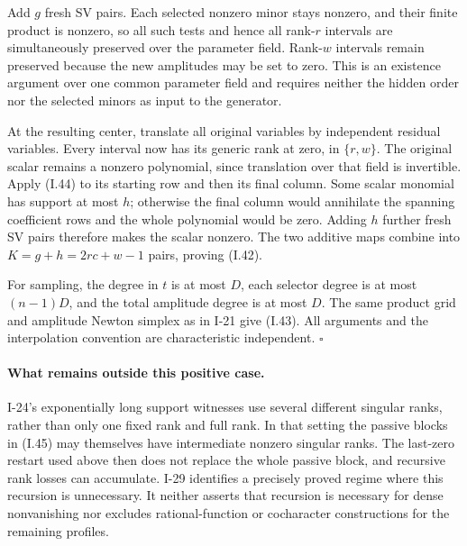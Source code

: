 Add $g$ fresh SV pairs.  Each selected nonzero minor stays
nonzero, and their finite product is nonzero, so all such
tests and hence all rank-$r$ intervals are simultaneously
preserved over the parameter field.  Rank-$w$ intervals
remain preserved because the new amplitudes may be set to
zero.  This is an existence argument over one common
parameter field and requires neither the hidden order nor
the selected minors as input to the generator.

At the resulting center, translate all original variables
by independent residual variables.  Every interval now
has its generic rank at zero, in $\{r,w\}$.  The original
scalar remains a nonzero polynomial, since translation
over that field is invertible.  Apply (I.44) to its starting
row and then its final column.  Some scalar monomial has
support at most $h$; otherwise the final column would
annihilate the spanning coefficient rows and the whole
polynomial would be zero.  Adding $h$ further fresh SV pairs
therefore makes the scalar nonzero.  The two additive maps
combine into $K=g+h=2rc+w-1$ pairs, proving (I.42).

For sampling, the degree in $t$ is at most $D$, each selector
degree is at most $(n-1)D$, and the total amplitude degree
is at most $D$.  The same product grid and amplitude Newton
simplex as in I-21 give (I.43).  All arguments and the
interpolation convention are characteristic independent.
\hfill$\square$

\paragraph{What remains outside this positive case.}
I-24's exponentially long support witnesses use several
different singular ranks, rather than only one fixed rank
and full rank.  In that setting the passive blocks in
(I.45) may themselves have intermediate nonzero singular
ranks.  The last-zero restart used above then does not
replace the whole passive block, and recursive rank losses
can accumulate.  I-29 identifies a precisely proved regime
where this recursion is unnecessary.  It neither asserts
that recursion is necessary for dense nonvanishing nor
excludes rational-function or cocharacter constructions
for the remaining profiles.
